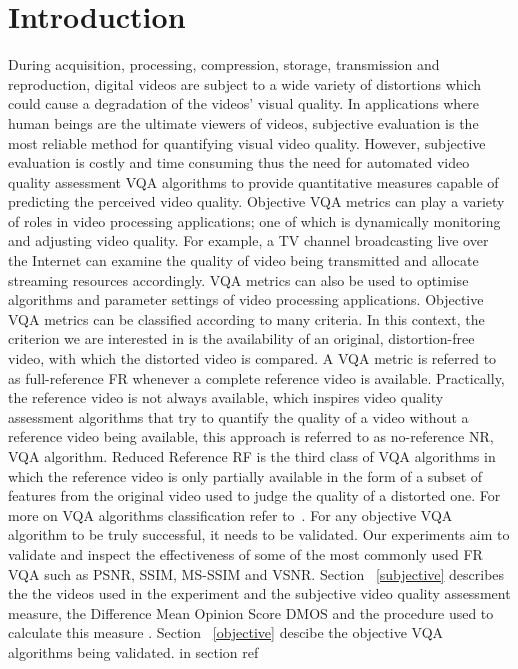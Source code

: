\documentclass{article}
\begin{document}
\section{Introduction}
\label{sec:intro}
During acquisition, processing, compression, storage, transmission and reproduction, digital videos are subject to a wide variety of distortions which could cause a degradation of the videos' visual quality. In applications where human beings are the ultimate viewers of videos, subjective evaluation is the most reliable method for quantifying visual video quality. However, subjective evaluation is costly and time consuming thus the need for automated video quality assessment VQA algorithms to provide quantitative measures capable of predicting the perceived video quality. Objective VQA metrics can play a variety of roles in video processing applications; one of which is dynamically monitoring and adjusting video quality. For example, a TV channel broadcasting live over the Internet can examine the quality of video being transmitted and allocate streaming resources accordingly. VQA metrics can also be used to optimise algorithms and parameter settings of video processing applications.
Objective VQA metrics can be classified according to many criteria. In this context, the criterion we are interested in is the availability of an original, distortion-free video, with which the distorted video is compared. A VQA metric is referred to as full-reference FR whenever a complete reference video is available. Practically, the reference video is not always available, which inspires video quality assessment algorithms that try to quantify the quality of a video without a reference video being available, this approach is referred to as no-reference NR, VQA algorithm. Reduced Reference RF is the third class of VQA algorithms in which the reference video is only partially available in the form of a subset of features from the original video used to judge the quality of a distorted one. For more on VQA algorithms classification refer to~\cite{wang2006}.
For any objective VQA algorithm to be truly successful, it needs to be validated. Our experiments aim to validate and inspect the effectiveness of some of the most commonly used FR VQA such as PSNR, SSIM, MS-SSIM and VSNR.
Section ~\ref{subjective} describes the the videos used in the experiment  and the subjective video quality assessment measure, the Difference Mean Opinion Score DMOS and the procedure used to calculate this measure . Section ~\ref{objective} descibe the objective VQA algorithms being validated. in section ref 
\end{document}
